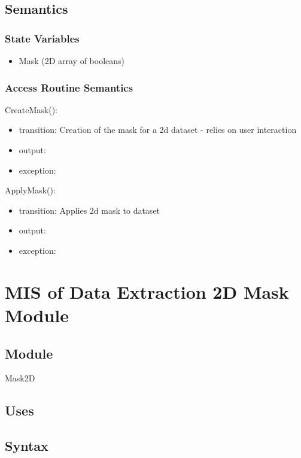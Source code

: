 \documentclass[12pt, titlepage]{article}
\begin{document}
\subsection{Semantics}

\subsubsection{State Variables}
\begin{itemize}
\item Mask (2D array of booleans)
\end{itemize}

\subsubsection{Access Routine Semantics}

\noindent CreateMask():
\begin{itemize}
\item transition: Creation of the mask for a 2d dataset - relies on user interaction
\item output:  
\item exception:  
\end{itemize}

\noindent ApplyMask():
\begin{itemize}
\item transition: Applies 2d mask to dataset
\item output:  
\item exception:  
\end{itemize}

\section{MIS of Data Extraction 2D Mask Module} \label{Mod:Mask2D}

\subsection{Module}

Mask2D

\subsection{Uses}


\subsection{Syntax}
\end{document}
